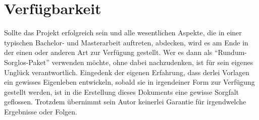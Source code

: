 \section{Verfügbarkeit}

Sollte das Projekt erfolgreich sein und alle wesentlichen Aspekte, die in einer typischen Bachelor- und Masterarbeit auftreten, abdecken, wird es am Ende in der einen oder anderen Art zur Verfügung gestellt. Wer es dann als \enquote{Rundum-Sorglos-Paket} verwenden möchte, ohne dabei nachzudenken, ist für sein eigenes Unglück verantwortlich. Eingedenk der eigenen Erfahrung, dass derlei Vorlagen ein gewisses Eigenleben entwickeln, sobald sie in irgendeiner Form zur Verfügung gestellt werden, ist in die Erstellung dieses Dokuments eine gewisse Sorgfalt geflossen. Trotzdem übernimmt sein Autor keinerlei Garantie für irgendwelche Ergebnisse oder Folgen.

